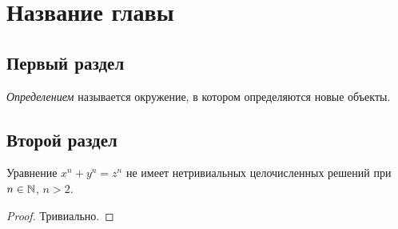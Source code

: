 \section{Название главы}

\subsection{Первый раздел}

\begin{definition}
	\textit{Определением} называется окружение, в котором определяются новые объекты.
\end{definition}

\subsection{Второй раздел}

\begin{theorem}
    Уравнение $x^n + y^n = z^n$ не имеет нетривиальных целочисленных решений при $n \in \mathbb{N}$, $n > 2$.
\end{theorem}

\begin{proof}
    Тривиально.
\end{proof}
